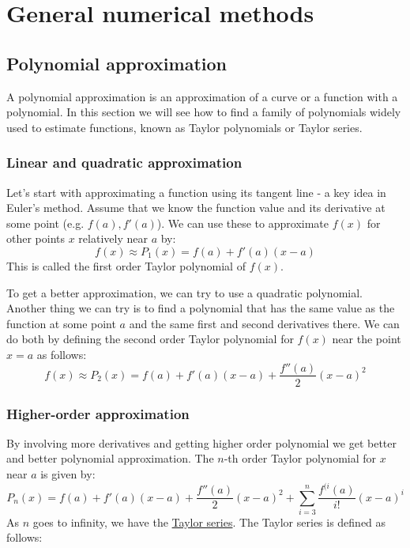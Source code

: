 \section{General numerical methods}
\subsection{Polynomial approximation}
A polynomial approximation is an approximation of a curve or a function with a polynomial. In this section we will see how to find a family of polynomials widely used to estimate functions, known as Taylor polynomials or Taylor series.



\subsubsection{Linear and quadratic approximation}
Let's start with approximating a function using its tangent line - a key idea in Euler's method. Assume that we know the function value and its derivative at some point (e.g. $f(a), f'(a)$). We can use these to approximate $f(x)$ for other points $x$ relatively near $a$ by:
\begin{equation}
	f(x) \approx P_1(x) = f(a) + f'(a)(x-a)
\end{equation}
This is called the first order Taylor polynomial of $f(x)$.

To get a better approximation, we can try to use a quadratic polynomial. Another thing we can try is to find a polynomial that has the same value as the function at some point $a$ and the same first and second derivatives there. We can do both by defining the second order Taylor polynomial for $f(x)$ near the point $x = a$ as follows:
\begin{equation}
	f(x) \approx P_2(x) = f(a) + f'(a)(x-a) + \frac{f''(a)}{2}(x-a)^2
\end{equation}



\subsubsection{Higher-order approximation}
By involving more derivatives and getting higher order polynomial we get better and better polynomial approximation. The $n$-th order Taylor polynomial for $x$ near $a$ is given by:
\begin{equation}
	P_n(x) = f(a) + f'(a)(x-a) + \frac{f''(a)}{2}(x-a)^2 + \sum_{i=3}^n \frac{f^{(i}(a)}{i!}(x-a)^i
\end{equation}
As $n$ goes to infinity, we have the \href{https://en.wikipedia.org/wiki/Taylor_series}{Taylor series}. The Taylor series is defined as follows:

